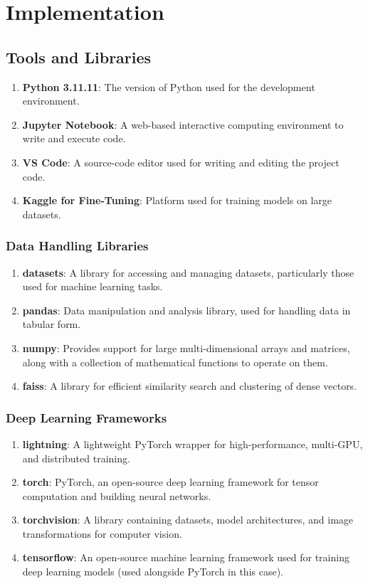 \chapter{Implementation}
\label{chap:implementation}

\section{Tools and Libraries}

\begin{enumerate}
    \setlength\itemsep{-1.05em}
    \item \textbf{Python 3.11.11}: The version of Python used for the development environment.
    \item \textbf{Jupyter Notebook}: A web-based interactive computing environment to write and execute code.
    \item \textbf{VS Code}: A source-code editor used for writing and editing the project code.
    \item \textbf{Kaggle for Fine-Tuning}: Platform used for training models on large datasets.
\end{enumerate}

\subsection*{Data Handling Libraries}
\begin{enumerate}
    \setlength\itemsep{-1.05em}
    \item \textbf{datasets}: A library for accessing and managing datasets, particularly those used for machine learning tasks.
    \item \textbf{pandas}: Data manipulation and analysis library, used for handling data in tabular form.
    \item \textbf{numpy}: Provides support for large multi-dimensional arrays and matrices, along with a collection of mathematical functions to operate on them.
    \item \textbf{faiss}: A library for efficient similarity search and clustering of dense vectors.
\end{enumerate}

\subsection*{Deep Learning Frameworks}
\begin{enumerate}
    \setlength\itemsep{-1.05em}
    \item \textbf{lightning}: A lightweight PyTorch wrapper for high-performance, multi-GPU, and distributed training.
    \item \textbf{torch}: PyTorch, an open-source deep learning framework for tensor computation and building neural networks.
    \item \textbf{torchvision}: A library containing datasets, model architectures, and image transformations for computer vision.
    \item \textbf{tensorflow}: An open-source machine learning framework used for training deep learning models (used alongside PyTorch in this case).
\end{enumerate}

